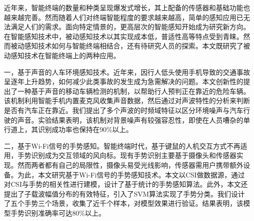 \begin{cabstract}


近年来，智能终端的数量和种类呈现爆发式增长，其上配备的传感器和基础功能也越来越完善。然而随着人们对终端智能程度的要求越来越高，简单的感知应用已无法满足人们的需求。面向特定情景的，更高层次的智能感知开始成为研究新方向。在智能感知技术中，被动感知技术以其实现成本低，普适性高等特点受到青睐。然而被动感知技术如何与智能终端相结合，还有待研究人员的探索。本文既研究了被动感知技术在智能终端上的两种应用。

一，基于声音的人车环境感知技术。近年来，因行人低头使用手机导致的交通事故呈逐年上升趋势，如何减少此类事故的发生成为急需解决的问题。本文创新性的提出了一种基于声音的移动车辆检测的机制，以帮助行人预判正在靠近的危险车辆。该机制利用智能手机内置麦克风收集声音数据，然后通过对声波特性的分析来判断是否有汽车正在靠近。我们提出了多个声波的时频域特征以区分环境噪声与汽车行驶的声音。实验结果表明，该机制对背景噪声有较强容忍性，即使在人员嘈杂的单行道上，其识别成功率也保持在90\%以上。

二，基于Wi-Fi信号的手势感知。智能终端时代，基于键鼠的人机交互方式不再适用，手势识别成为交互领域的风向标。现有手势识别主要基于摄像头和传感器实现。然而两者都有自己的局限性，摄像头易受光线影响，传感器需用户携带额外设备。为此，本文研究基于Wi-Fi信号的手势感知技术。本文以CSI做数据源，通过对CSI与手势的相关性进行建模，设计了基于统计的手势感知算法。此外，本文还提出了子载波幅值分布的有效特征，引入了SVM算法实现了手势分类。我们设计了五个手势三个场景，收集了近千个样本，对模型效果进行验证。结果表明，该模型手势识别准确率可达80\%以上。

\end{cabstract}

